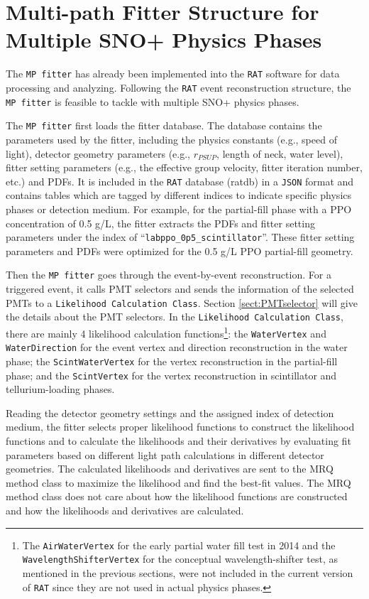 \section{Multi-path Fitter Structure for Multiple SNO+ Physics Phases}

The \texttt{MP fitter} has already been implemented into the \texttt{RAT} software for data processing and analyzing. Following the \texttt{RAT} event reconstruction structure, the \texttt{MP fitter} is feasible to tackle with multiple SNO+ physics phases. 

The \texttt{MP fitter} first loads the fitter database. The database contains the parameters used by the fitter, including the physics constants (e.g., speed of light), detector geometry parameters (e.g., $r_{PSUP}$, length of neck, water level), fitter setting parameters (e.g., the effective group velocity, fitter iteration number, etc.) and PDFs. It is included in the \texttt{RAT} database (ratdb) in a \texttt{JSON} format\cite{JSONwiki} and contains tables which are tagged by different indices to indicate specific physics phases or detection medium. For example, for the partial-fill phase with a PPO concentration of 0.5 g/L, the fitter extracts the PDFs and fitter setting parameters under the index of ``\texttt{labppo\_0p5\_scintillator}''. These fitter setting parameters and PDFs were optimized for the 0.5 g/L PPO partial-fill geometry.

Then the \texttt{MP fitter} goes through the event-by-event reconstruction. For a triggered event, it calls PMT selectors and sends the information of the selected PMTs to a \texttt{Likelihood Calculation Class}. Section \ref{sect:PMTselector} will give the details about the PMT selectors. In the \texttt{Likelihood Calculation Class}, there are mainly 4 likelihood calculation functions\footnote{The \texttt{AirWaterVertex} for the early partial water fill test in 2014 and the \texttt{WavelengthShifterVertex} for the conceptual wavelength-shifter test, as mentioned in the previous sections, were not included in the current version of \texttt{RAT} since they are not used in actual physics phases.}: the \texttt{WaterVertex} and \texttt{WaterDirection} for the event vertex and direction reconstruction in the water phase; the \texttt{ScintWaterVertex} for the vertex reconstruction in the partial-fill phase; and the \texttt{ScintVertex} for the vertex reconstruction in scintillator and tellurium-loading phases.

Reading the detector geometry settings and the assigned index of detection medium, the fitter selects proper likelihood functions to construct the likelihood functions and to calculate the likelihoods and their derivatives by evaluating fit parameters based on different light path calculations in different detector geometries. The calculated likelihoods and derivatives are sent to the MRQ method class to maximize the likelihood and find the best-fit values. The MRQ method class does not care about how the likelihood functions are constructed and how the likelihoods and derivatives are calculated. 
	
